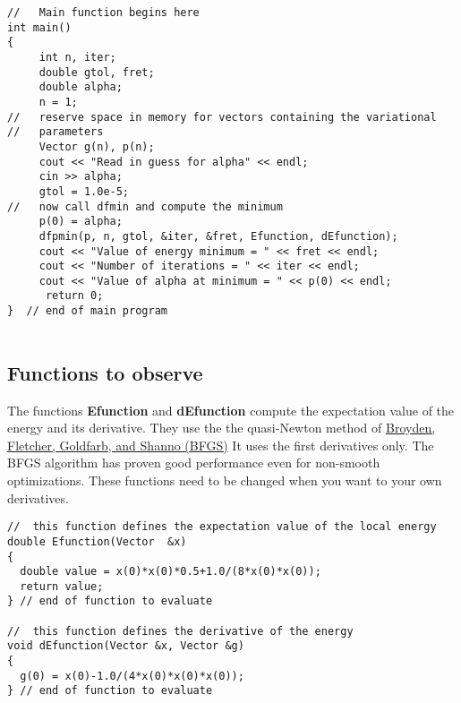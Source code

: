 \documentclass[%
oneside,                 %
final,                   %
10pt]{article}
\begin{document}
\begin{verbatim}
//   Main function begins here
int main()
{
     int n, iter;
     double gtol, fret;
     double alpha;
     n = 1;
//   reserve space in memory for vectors containing the variational
//   parameters
     Vector g(n), p(n);
     cout << "Read in guess for alpha" << endl;
     cin >> alpha;
     gtol = 1.0e-5;
//   now call dfmin and compute the minimum
     p(0) = alpha;
     dfpmin(p, n, gtol, &iter, &fret, Efunction, dEfunction);
     cout << "Value of energy minimum = " << fret << endl;
     cout << "Number of iterations = " << iter << endl;
     cout << "Value of alpha at minimum = " << p(0) << endl;
      return 0;
}  // end of main program


\end{verbatim}


\subsection*{Functions to observe}

The functions \textbf{Efunction} and \textbf{dEfunction} compute the expectation value of the energy and its derivative.
They use the the quasi-Newton method of \href{{https://www.springer.com/it/book/9780387303031}}{Broyden, Fletcher, Goldfarb, and Shanno (BFGS)}
It uses the first derivatives only. The BFGS algorithm has proven good performance even for non-smooth optimizations. 
These functions need to be changed when you want to your own derivatives.













\begin{verbatim}
//  this function defines the expectation value of the local energy
double Efunction(Vector  &x)
{
  double value = x(0)*x(0)*0.5+1.0/(8*x(0)*x(0));
  return value;
} // end of function to evaluate

//  this function defines the derivative of the energy 
void dEfunction(Vector &x, Vector &g)
{
  g(0) = x(0)-1.0/(4*x(0)*x(0)*x(0));
} // end of function to evaluate

\end{verbatim}
\end{document}
